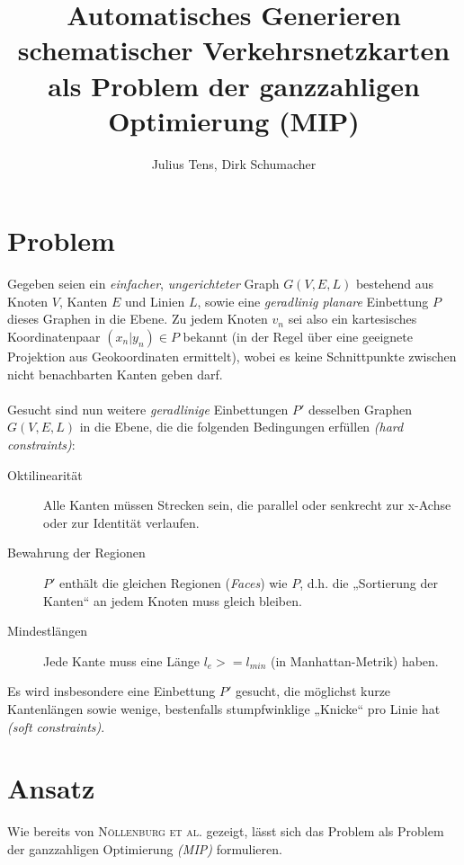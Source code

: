 \documentclass[a4paper,11pt]{amsart}
\title{Automatisches Generieren schematischer Verkehrsnetzkarten als Problem der ganzzahligen Optimierung (MIP)}
\author{Julius Tens, Dirk Schumacher}
\begin{document}
\maketitle

\section*{Problem}

\noindent Gegeben seien ein \textit{einfacher}, \textit{ungerichteter} Graph $G(V,E,L)$ bestehend aus Knoten $V$, Kanten $E$ und Linien $L$, sowie eine \textit{geradlinig planare} Einbettung $P$ dieses Graphen in die Ebene. Zu jedem Knoten $v_n$ sei also ein kartesisches Koordinatenpaar $(x_n | y_n) \in P$ bekannt (in der Regel über eine geeignete Projektion aus Geokoordinaten ermittelt), wobei es keine Schnittpunkte zwischen nicht benachbarten Kanten geben darf.
\\\\
Gesucht sind nun weitere \textit{geradlinige} Einbettungen $P'$ desselben Graphen $G(V,E,L)$ in die Ebene, die die folgenden Bedingungen erfüllen \textit{(hard constraints)}:
\bigskip

\begin{description}
\item[Oktilinearität] Alle Kanten müssen Strecken sein, die parallel oder senkrecht zur x-Achse oder zur Identität verlaufen.
\bigskip
\item[Bewahrung der Regionen] $P'$ enthält die gleichen Regionen (\textit{Faces}) wie $P$, d.h. die „Sortierung der Kanten“ an jedem Knoten muss gleich bleiben.
\bigskip
\item[Mindestlängen] Jede Kante muss eine Länge $l_e >= l_{min}$ (in Manhattan-Metrik) haben.
\bigskip
\end{description}

\noindent Es wird insbesondere eine Einbettung $P'$ gesucht, die möglichst kurze Kantenlängen sowie wenige, bestenfalls stumpfwinklige „Knicke“ pro Linie hat \textit{(soft constraints)}.
\bigskip
\bigskip

\section*{Ansatz}

\noindent Wie bereits von \textsc{Nöllenburg et al.} gezeigt, lässt sich das Problem als Problem der ganzzahligen Optimierung \textit{(MIP)} formulieren.
\bigskip
\bigskip
\end{document}
